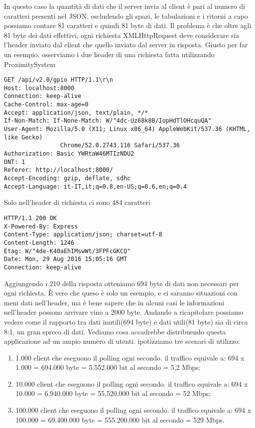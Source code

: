 In questo caso la quantità di dati che il server invia al client è pari al numero di caratteri presenti nel JSON, escludendo gli spazi, le tabulazioni e i ritorni a capo possiamo contare 81 caratteri e quindi 81 byte di dati.
Il problema è che oltre agli 81 byte dei dati effettivi, ogni richiesta XMLHttpRequest deve considerare sia l'header inviato dal client che quello inviato dal server in risposta.
Giusto per far un esempio, osserviamo i due header di una richiesta fatta utilizzando ProximitySystem
\begin{lstlisting}[caption={header client}, style=javaScriptCode]
GET /api/v2.0/gpio HTTP/1.1\r\n
Host: localhost:8000
Connection: keep-alive
Cache-Control: max-age=0
Accept: application/json, text/plain, */*
If-Non-Match: If-None-Match: W/"4dc-Uz68k8B/IopHdTlOHcquQA"
User-Agent: Mozilla/5.0 (X11; Linux x86_64) AppleWebKit/537.36 (KHTML, like Gecko) 
				Chrome/52.0.2743.116 Safari/537.36
Authorization: Basic YWRtaW46MTIzNDU2
DNT: 1
Referer: http://localhost:8000/
Accept-Encoding: gzip, deflate, sdhc
Accept-Language: it-IT,it;q=0.8,en-US;q=0.6,en;q=0.4
\end{lstlisting}
Solo nell'header di richiesta ci sono 484 caratteri
\begin{lstlisting}[caption={header server}, style=javaScriptCode]
HTTP/1.1 200 OK
X-Powered-By: Express
Content-Type: application/json; charset=utf-8
Content-Length: 1246
Etag: W/"4de-K40aEhIMswWt/3FPFcGKCQ"
Date: Mon, 29 Aug 2016 15:05:16 GMT
Connection: keep-alive

\end{lstlisting} 
Aggiungendo i 210 della risposta otteniamo 694 byte di dati non necessari per ogni richiesta. 
È vero che queso è solo un esempio, e ci saranno situazioni con meni dati nell'header, ma è bene sapere che in alcuni casi le informazioni nell'header possono arrivare vino a 2000 byte.
Andando a ricapitolare possiamo vedere come il rapporto tra dati inutili(694 byte) e dati utili(81 byte) sia di  circa 8:1, un gran spreco di dati.
Vediamo cosa accadrebbe distribuendo questa applicazione ad un ampio numero di utenti. 
ipotizziamo tre scenari di utilizzo:
\begin{enumerate}
\item 1.000 client che eseguono il polling ogni secondo.
il traffico equivale a: 694 x 1.000 = 694.000 byte = 5.552.000 bit al secondo = 5,2 Mbps;
\item 10.000 client che eseguono il polling ogni secondo.
il traffico equivale a: 694 x 10.000 = 6.940.000 byte = 55.520.000 bit al secondo = 52 Mbps;
\item 100.000 client che eseguono il polling ogni secondo.
il traffico equivale a: 694 x 100.000 = 69.400.000 byte = 555.200.000 bit al secondo = 529 Mbps.
\end{enumerate}
